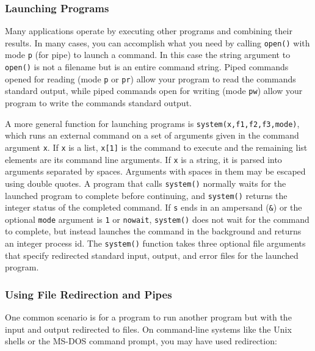 \subsubsection[Launching Programs]{Launching Programs}

Many applications operate by executing other programs and combining
their results. In many cases, you can accomplish what you need by
calling \texttt{open()} with mode
\texttt{{\textquotedbl}p{\textquotedbl}} (for pipe) to
launch a command. In this case the string argument to \texttt{open()}
is not a filename but is an entire command string. Piped commands
opened for reading (mode \texttt{{\textquotedbl}p{\textquotedbl}} or
\texttt{{\textquotedbl}pr{\textquotedbl}}) allow your program to read
the command{\textquotesingle}s standard output, while piped commands
open for writing (mode \texttt{{\textquotedbl}pw{\textquotedbl}}) allow
your program to write the command{\textquotesingle}s standard output.

A more general function for launching programs is
\texttt{system(x,f1,f2,f3,mode)}, which runs an external command on a
set of arguments given in the command argument \texttt{x}. If
\texttt{x} is a list, \texttt{x[1]} is the command to execute and the
remaining list elements are its command line arguments. If \texttt{x}
is a string, it is parsed into arguments separated by spaces. Arguments
with spaces in them may be escaped using double quotes. A program that
calls \texttt{system()} normally waits for the launched
program to complete before continuing, and \texttt{system()} returns
the integer status of the completed command. If \texttt{s} ends in an
ampersand (\texttt{\&}) or the optional \texttt{mode} argument is
\texttt{1} or \texttt{{\textquotedbl}nowait{\textquotedbl}},
\texttt{system()} does not wait for the command to complete, but
instead launches the command in the background and returns an integer
process id. The \texttt{system()} function takes three optional file
arguments that specify redirected standard input, output, and error
files for the launched program.

\subsubsection[Using File Redirection and Pipes]{Using File Redirection
and Pipes}

One common scenario is for a program to run
another program but with the input and output redirected to files. On
command-line systems like the Unix shells or the MS-DOS command prompt,
you may have used redirection:

